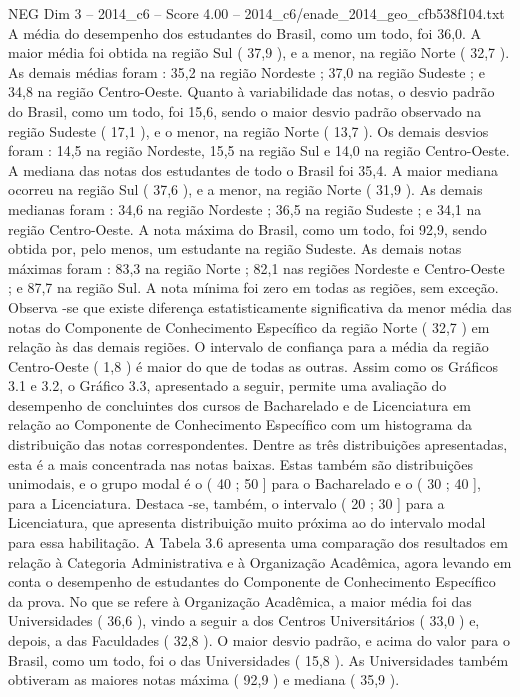 \begin{textsample}{NEG Dim 3 – 2014\_c6 – Score 4.00 – 2014\_c6/enade\_2014\_geo\_cfb538f104.txt}
A média do desempenho dos estudantes do Brasil, como um todo, foi 36,0.
A maior média foi obtida na região Sul ( 37,9 ), e a menor, na região Norte ( 32,7 ).
As demais médias foram : 35,2 na região Nordeste ; 37,0 na região Sudeste ; e 34,8 na região Centro-Oeste.
Quanto à variabilidade das notas, o desvio padrão do Brasil, como um todo, foi 15,6, sendo o maior desvio padrão observado na região Sudeste ( 17,1 ), e o menor, na região Norte ( 13,7 ).
Os demais desvios foram : 14,5 na região Nordeste, 15,5 na região Sul e 14,0 na região Centro-Oeste.
A mediana das notas dos estudantes de todo o Brasil foi 35,4.
A maior mediana ocorreu na região Sul ( 37,6 ), e a menor, na região Norte ( 31,9 ).
As demais medianas foram : 34,6 na região Nordeste ; 36,5 na região Sudeste ; e 34,1 na região Centro-Oeste.
A nota máxima do Brasil, como um todo, foi 92,9, sendo obtida por, pelo menos, um estudante na região Sudeste.
As demais notas máximas foram : 83,3 na região Norte ; 82,1 nas regiões Nordeste e Centro-Oeste ; e 87,7 na região Sul.
A nota mínima foi zero em todas as regiões, sem exceção.
Observa -se que existe diferença estatisticamente significativa da menor média das notas do Componente de Conhecimento Específico da região Norte ( 32,7 ) em relação às das demais regiões.
O intervalo de confiança para a média da região Centro-Oeste ( 1,8 ) é maior do que de todas as outras.
Assim como os Gráficos 3.1 e 3.2, o Gráfico 3.3, apresentado a seguir, permite uma avaliação do desempenho de concluintes dos cursos de Bacharelado e de Licenciatura em relação ao Componente de Conhecimento Específico com um histograma da distribuição das notas correspondentes.
Dentre as três distribuições apresentadas, esta é a mais concentrada nas notas baixas.
Estas também são distribuições unimodais, e o grupo modal é o ( 40 ; 50 ] para o Bacharelado e o ( 30 ; 40 ], para a Licenciatura.
Destaca -se, também, o intervalo ( 20 ; 30 ] para a Licenciatura, que apresenta distribuição muito próxima ao do intervalo modal para essa habilitação.
A Tabela 3.6 apresenta uma comparação dos resultados em relação à Categoria Administrativa e à Organização Acadêmica, agora levando em conta o desempenho de estudantes do Componente de Conhecimento Específico da prova.
No que se refere à Organização Acadêmica, a maior média foi das Universidades ( 36,6 ), vindo a seguir a dos Centros Universitários ( 33,0 ) e, depois, a das Faculdades ( 32,8 ).
O maior desvio padrão, e acima do valor para o Brasil, como um todo, foi o das Universidades ( 15,8 ).
As Universidades também obtiveram as maiores notas máxima ( 92,9 ) e mediana ( 35,9 ).

\end{textsample}
